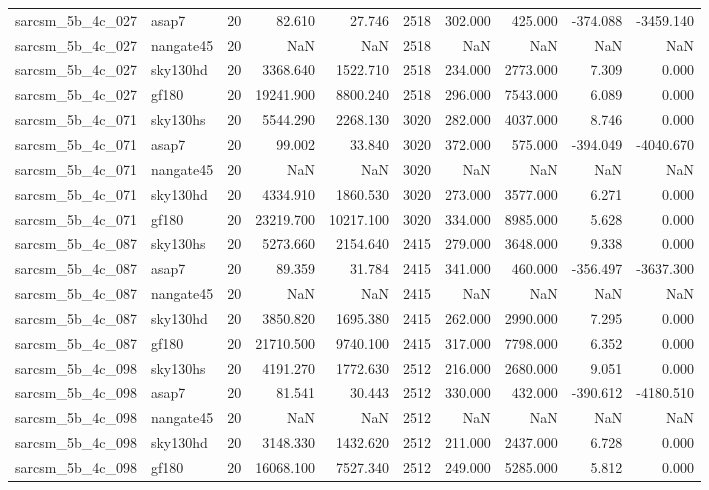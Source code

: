 \documentclass{article}
\begin{document}
\begin{longtable}{llrrrrrrrr}
sarcsm\_5b\_4c\_027 & asap7 & 20 & 82.610 & 27.746 & 2518 & 302.000 & 425.000 & -374.088 & -3459.140 \\
sarcsm\_5b\_4c\_027 & nangate45 & 20 & NaN & NaN & 2518 & NaN & NaN & NaN & NaN \\
sarcsm\_5b\_4c\_027 & sky130hd & 20 & 3368.640 & 1522.710 & 2518 & 234.000 & 2773.000 & 7.309 & 0.000 \\
sarcsm\_5b\_4c\_027 & gf180 & 20 & 19241.900 & 8800.240 & 2518 & 296.000 & 7543.000 & 6.089 & 0.000 \\
sarcsm\_5b\_4c\_071 & sky130hs & 20 & 5544.290 & 2268.130 & 3020 & 282.000 & 4037.000 & 8.746 & 0.000 \\
sarcsm\_5b\_4c\_071 & asap7 & 20 & 99.002 & 33.840 & 3020 & 372.000 & 575.000 & -394.049 & -4040.670 \\
sarcsm\_5b\_4c\_071 & nangate45 & 20 & NaN & NaN & 3020 & NaN & NaN & NaN & NaN \\
sarcsm\_5b\_4c\_071 & sky130hd & 20 & 4334.910 & 1860.530 & 3020 & 273.000 & 3577.000 & 6.271 & 0.000 \\
sarcsm\_5b\_4c\_071 & gf180 & 20 & 23219.700 & 10217.100 & 3020 & 334.000 & 8985.000 & 5.628 & 0.000 \\
sarcsm\_5b\_4c\_087 & sky130hs & 20 & 5273.660 & 2154.640 & 2415 & 279.000 & 3648.000 & 9.338 & 0.000 \\
sarcsm\_5b\_4c\_087 & asap7 & 20 & 89.359 & 31.784 & 2415 & 341.000 & 460.000 & -356.497 & -3637.300 \\
sarcsm\_5b\_4c\_087 & nangate45 & 20 & NaN & NaN & 2415 & NaN & NaN & NaN & NaN \\
sarcsm\_5b\_4c\_087 & sky130hd & 20 & 3850.820 & 1695.380 & 2415 & 262.000 & 2990.000 & 7.295 & 0.000 \\
sarcsm\_5b\_4c\_087 & gf180 & 20 & 21710.500 & 9740.100 & 2415 & 317.000 & 7798.000 & 6.352 & 0.000 \\
sarcsm\_5b\_4c\_098 & sky130hs & 20 & 4191.270 & 1772.630 & 2512 & 216.000 & 2680.000 & 9.051 & 0.000 \\
sarcsm\_5b\_4c\_098 & asap7 & 20 & 81.541 & 30.443 & 2512 & 330.000 & 432.000 & -390.612 & -4180.510 \\
sarcsm\_5b\_4c\_098 & nangate45 & 20 & NaN & NaN & 2512 & NaN & NaN & NaN & NaN \\
sarcsm\_5b\_4c\_098 & sky130hd & 20 & 3148.330 & 1432.620 & 2512 & 211.000 & 2437.000 & 6.728 & 0.000 \\
sarcsm\_5b\_4c\_098 & gf180 & 20 & 16068.100 & 7527.340 & 2512 & 249.000 & 5285.000 & 5.812 & 0.000 \\

\end{longtable}
\end{document}
